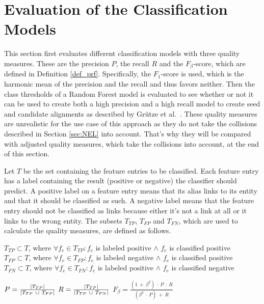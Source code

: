 \section{Evaluation of the Classification Models}
\label{sec:ModelEval}
This section first evaluates different classification models with three quality measures. These are the precision $P$, the recall $R$ and the $F_{\beta}$-score, which are defined in Definition \ref{def_prf}. Specifically, the $F_1$-score is used, which is the harmonic mean of the precision and the recall and thus favors neither. Then the class thresholds of a Random Forest model is evaluated to see whether or not it can be used to create both a high precision and a high recall model to create seed and candidate alignments as described by Grütze et al.\ \cite{coheel}. These quality measures are unrealistic for the use case of this approach as they do not take the collisions described in Section \ref{sec:NEL} into account. That's why they will be compared with adjusted quality measures, which take the collisions into account, at the end of this section.\par
Let $T$ be the set containing the feature entries to be classified. Each feature entry has a label containing the result (positive or negative) the classifier should predict. A positive label on a feature entry means that its alias links to its entity and that it should be classified as such. A negative label means that the feature entry should not be classified as links because either it's not a link at all or it links to the wrong entity. The subsets $T_{TP}$, $T_{FP}$ and $T_{FN}$, which are used to calculate the quality measures, are defined as follows.\\
\begin{nscenter}
	$T_{TP} \subset T$, where $\forall f_e \in T_{TP}: f_e$ is labeled positive $\land$ $f_e$ is classified positive\\
	$T_{FP} \subset T$, where $\forall f_e \in T_{FP}: f_e$ is labeled negative $\land$ $f_e$ is classified positive\\
	$T_{FN} \subset T$, where $\forall f_e \in T_{FN}: f_e$ is labeled positive $\land$ $f_e$ is classified negative\\
\end{nscenter}
\begin{definition}
$P = \frac{\left|T_{TP}\right|}{\left|T_{TP} \ \cup \ T_{FP}\right|}$
$R = \frac{\left|T_{TP}\right|}{\left|T_{TP} \ \cup \ T_{FN}\right|}$
$F_{\beta} = \frac{(1 \ + \ \beta^2) \ \cdot \ P \ \cdot \ R}{(\beta^2 \ \cdot \ P) \ + \ R}$
\label{def_prf}
\end{definition}
